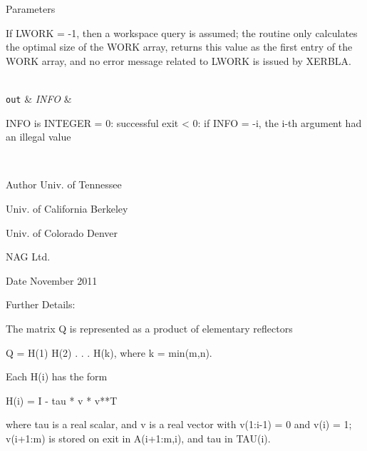 \begin{DoxyParams}[1]{Parameters}
\begin{DoxyVerb}
          If LWORK = -1, then a workspace query is assumed; the routine
          only calculates the optimal size of the WORK array, returns
          this value as the first entry of the WORK array, and no error
          message related to LWORK is issued by XERBLA.\end{DoxyVerb}
\\
\hline
\mbox{\tt out}  & {\em I\+N\+F\+O} & \begin{DoxyVerb}          INFO is INTEGER
          = 0:  successful exit
          < 0:  if INFO = -i, the i-th argument had an illegal value\end{DoxyVerb}
 \\
\hline
\end{DoxyParams}
\begin{DoxyAuthor}{Author}
Univ. of Tennessee 

Univ. of California Berkeley 

Univ. of Colorado Denver 

N\+A\+G Ltd. 
\end{DoxyAuthor}
\begin{DoxyDate}{Date}
November 2011 
\end{DoxyDate}
\begin{DoxyParagraph}{Further Details\+: }
\begin{DoxyVerb}  The matrix Q is represented as a product of elementary reflectors

     Q = H(1) H(2) . . . H(k), where k = min(m,n).

  Each H(i) has the form

     H(i) = I - tau * v * v**T

  where tau is a real scalar, and v is a real vector with
  v(1:i-1) = 0 and v(i) = 1; v(i+1:m) is stored on exit in A(i+1:m,i),
  and tau in TAU(i).\end{DoxyVerb}
 
\end{DoxyParagraph}
\hypertarget{group__doubleGEcomputational_gaddcf152e87deec6123a1899f6f51101e}{}
